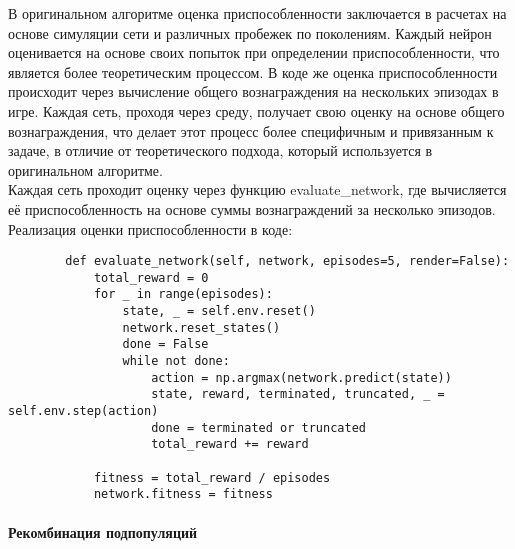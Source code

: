 \documentclass[a4paper,12pt]{article}
\begin{document}
В оригинальном алгоритме оценка приспособленности заключается в расчетах на основе симуляции сети и различных пробежек по поколениям. Каждый нейрон оценивается на основе своих попыток при определении приспособленности, что является более теоретическим процессом. В коде же оценка приспособленности происходит через вычисление общего вознаграждения на нескольких эпизодах в игре. Каждая сеть, проходя через среду, получает свою оценку на основе общего вознаграждения, что делает этот процесс более специфичным и привязанным к задаче, в отличие от теоретического подхода, который используется в оригинальном алгоритме.~\\ 
Каждая сеть проходит оценку через функцию evaluate\_network, где вычисляется её приспособленность на основе суммы вознаграждений за несколько эпизодов.~\\ 
Реализация оценки приспособленности в коде:
	\begin{itemize}
        
        \begin{lstlisting}
        def evaluate_network(self, network, episodes=5, render=False):
            total_reward = 0
            for _ in range(episodes):
                state, _ = self.env.reset()
                network.reset_states()
                done = False
                while not done:
                    action = np.argmax(network.predict(state))
                    state, reward, terminated, truncated, _ = self.env.step(action)
                    done = terminated or truncated
                    total_reward += reward
        
            fitness = total_reward / episodes
            network.fitness = fitness

        \end{lstlisting}
	\end{itemize}
	


\paragraph{Рекомбинация подпопуляций}~\\ 
\end{document}
